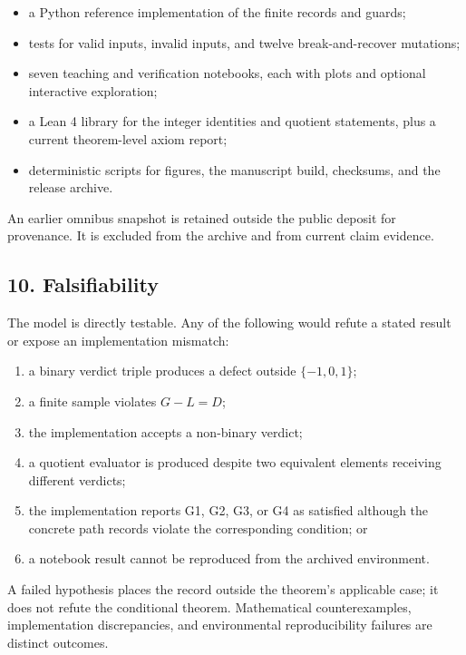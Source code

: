 \documentclass[
  11pt,
]{article}
\providecommand{\tightlist}{%
  \setlength{\itemsep}{0pt}\setlength{\parskip}{0pt}}
\theoremstyle{plain}
\theoremstyle{definition}\newtheorem{definition}[theorem]{Definition}
\theoremstyle{remark}\newtheorem*{remark}{Remark}
\begin{document}
\begin{itemize}
\tightlist
\item
  a Python reference implementation of the finite records and guards;
\item
  tests for valid inputs, invalid inputs, and twelve break-and-recover
  mutations;
\item
  seven teaching and verification notebooks, each with plots and optional
  interactive exploration;
\item
  a Lean 4 library for the integer identities and quotient
  statements, plus a current theorem-level axiom report;
\item
  deterministic scripts for figures, the manuscript build, checksums, and the
  release archive.
\end{itemize}

An earlier omnibus snapshot is retained outside the public deposit for
provenance. It is excluded from the archive and from current claim evidence.

\subsection{10. Falsifiability}\label{falsifiability}

The model is directly testable. Any of the following would refute a stated
result or expose an implementation mismatch:

\begin{enumerate}
\def\labelenumi{\arabic{enumi}.}
\tightlist
\item
  a binary verdict triple produces a defect outside \(\{-1,0,1\}\);
\item
  a finite sample violates \(G-L=D\);
\item
  the implementation accepts a non-binary verdict;
\item
  a quotient evaluator is produced despite two equivalent elements receiving
  different verdicts;
\item
  the implementation reports G1, G2, G3, or G4 as satisfied although the
  concrete path records violate the corresponding condition; or
\item
  a notebook result cannot be reproduced from the archived environment.
\end{enumerate}

A failed hypothesis places the record outside the theorem's applicable case; it
does not refute the conditional theorem. Mathematical counterexamples,
implementation discrepancies, and environmental reproducibility failures are
distinct outcomes.
\end{document}
